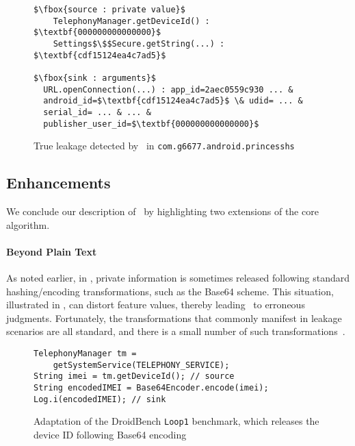 \begin{figure}
\begin{lstlisting}
$\fbox{source : private value}$
    TelephonyManager.getDeviceId() : $\textbf{000000000000000}$
    Settings$\$$Secure.getString(...) : $\textbf{cdf15124ea4c7ad5}$
   
$\fbox{sink : arguments}$
  URL.openConnection(...) : app_id=2aec0559c930 ... &
  android_id=$\textbf{cdf15124ea4c7ad5}$ \& udid= ... & 
  serial_id= ... & ... &
  publisher_user_id=$\textbf{000000000000000}$
\end{lstlisting}
\caption{\label{Fi:prince}True leakage detected by \Tool\ in {\tt com.g6677.android.princesshs}}
\end{figure}

\subsection{Enhancements}\label{Se:points}

We conclude our description of \Tool\ by highlighting two extensions of the core algorithm.

\paragraph{Beyond Plain Text} 

 As noted earlier, in , private information is sometimes released following standard hashing/encoding transformations, such as the Base64 scheme. This situation, illustrated in , can distort feature values, thereby leading \Tool\ to erroneous judgments. Fortunately, the transformations that commonly manifest in leakage scenarios are all standard, and there is a small number of such transformations~\cite{HHJSW:CCS11}.

\begin{figure}
\begin{lstlisting}
TelephonyManager tm =
    getSystemService(TELEPHONY_SERVICE);
String imei = tm.getDeviceId(); // source
String encodedIMEI = Base64Encoder.encode(imei);
Log.i(encodedIMEI); // sink
\end{lstlisting}
\caption{\label{Fi:encodedFlow} Adaptation of the DroidBench {\tt Loop1} benchmark, which releases the device ID following Base64 encoding}
\end{figure}

